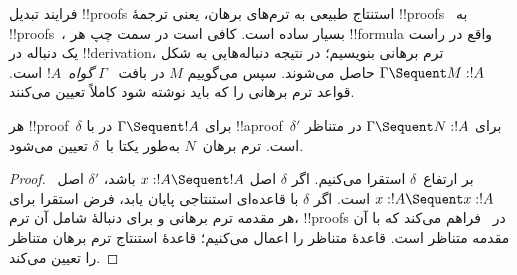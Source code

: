\documentclass[../../../include/open-logic-section]{subfiles}
\begin{document}


فرایند تبدیل !!{proof}s استنتاج طبیعی به ترم‌های برهان، یعنی ترجمهٔ
!!{proof}s~ به !!{proof}s~، بسیار ساده است.
کافی است در سمت چپ هر !!{formula} واقع در راست یک دنباله در
!!{derivation}، ترم برهانی بنویسیم؛ در نتیجه دنباله‌هایی به شکل
$\Gamma \Sequent M : !A$ حاصل می‌شوند. سپس می‌گوییم $M$ در بافت
~$\Gamma$ \emph{گواه}~$!A$ است. قواعد  ترم برهانی را که
باید نوشته شود کاملاً تعیین می‌کنند.

\begin{prop}
هر !!{proof}~$\delta$ برای $\Gamma \Sequent !A$ در  با
!!a{proof}~$\delta'$ برای $\Gamma \Sequent N : !A$ در 
متناظر است. ترم برهان~$N$ به‌طور یکتا با~$\delta$ تعیین می‌شود.
\end{prop}

\begin{proof}
بر ارتفاع~$\delta$ استقرا می‌کنیم. اگر $\delta$ اصل
$x:!A \Sequent !A$ باشد، $\delta'$ اصل~$x:!A \Sequent x:!A$ است.
اگر $\delta$ با قاعده‌ای استنتاجی پایان یابد، فرض استقرا برای هر مقدمه
ترم برهانی و برای دنبالهٔ شامل آن ترم، !!{proof}s در~ فراهم
می‌کند که با آن مقدمه متناظر است. قاعدهٔ متناظر  را اعمال
می‌کنیم؛ قاعدهٔ استنتاج  ترم برهان متناظر را تعیین می‌کند.
\end{proof}
\end{document}
